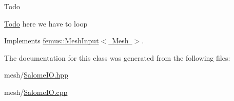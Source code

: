 \begin{DoxyRefDesc}{Todo}
\item[\mbox{\hyperlink{todo__todo000012}{Todo}}]here we have to loop \end{DoxyRefDesc}


Implements \mbox{\hyperlink{classfemus_1_1_mesh_input_abf3b91c5ef2cdcf99561ab7429101601}{femus\+::\+Mesh\+Input$<$ Mesh $>$}}.



The documentation for this class was generated from the following files\+:\begin{DoxyCompactItemize}
\item 
mesh/\mbox{\hyperlink{_salome_i_o_8hpp}{Salome\+I\+O.\+hpp}}\item 
mesh/\mbox{\hyperlink{_salome_i_o_8cpp}{Salome\+I\+O.\+cpp}}\end{DoxyCompactItemize}
